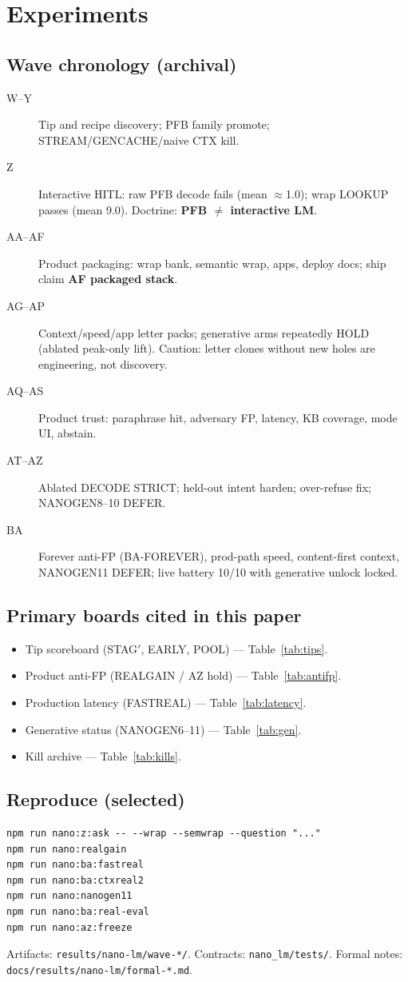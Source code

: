 \section{Experiments}
\label{sec:experiments}

\subsection{Wave chronology (archival)}
\begin{description}
  \item[W--Y] Tip and recipe discovery; PFB family promote; STREAM/GENCACHE/naive CTX kill.
  \item[Z] Interactive HITL: raw PFB decode fails (mean $\approx$1.0); wrap LOOKUP passes
        (mean 9.0). Doctrine: \textbf{PFB $\neq$ interactive LM}.
  \item[AA--AF] Product packaging: wrap bank, semantic wrap, apps, deploy docs;
        ship claim \textbf{AF packaged stack}.
  \item[AG--AP] Context/speed/app letter packs; generative arms repeatedly HOLD
        (ablated peak-only lift). Caution: letter clones without new holes are
        engineering, not discovery.
  \item[AQ--AS] Product trust: paraphrase hit, adversary FP, latency, KB coverage,
        mode UI, abstain.
  \item[AT--AZ] Ablated DECODE STRICT; held-out intent harden; over-refuse fix;
        NANOGEN8--10 DEFER.
  \item[BA] Forever anti-FP (BA-FOREVER), prod-path speed, content-first context,
        NANOGEN11 DEFER; live battery 10/10 with generative unlock locked.
\end{description}

\subsection{Primary boards cited in this paper}
\begin{itemize}
  \item Tip scoreboard (STAG$'$, EARLY, POOL) --- Table~\ref{tab:tips}.
  \item Product anti-FP (REALGAIN / AZ hold) --- Table~\ref{tab:antifp}.
  \item Production latency (FASTREAL) --- Table~\ref{tab:latency}.
  \item Generative status (NANOGEN6--11) --- Table~\ref{tab:gen}.
  \item Kill archive --- Table~\ref{tab:kills}.
\end{itemize}

\subsection{Reproduce (selected)}
\begin{verbatim}
npm run nano:z:ask -- --wrap --semwrap --question "..."
npm run nano:realgain
npm run nano:ba:fastreal
npm run nano:ba:ctxreal2
npm run nano:nanogen11
npm run nano:ba:real-eval
npm run nano:az:freeze
\end{verbatim}
Artifacts: \texttt{results/nano-lm/wave-*/}. Contracts: \texttt{nano\_lm/tests/}.
Formal notes: \texttt{docs/results/nano-lm/formal-*.md}.
